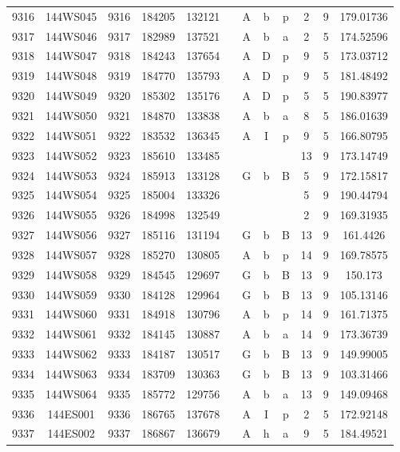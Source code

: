 \begin{tabular}{|*{12}{c|}}
9316 & 144WS045 & 9316 & 184205 & 132121 &  & A & b & p & 2 & 9 & 179.01736 \\ 
9317 & 144WS046 & 9317 & 182989 & 137521 &  & A & b & a & 2 & 5 & 174.52596 \\ 
9318 & 144WS047 & 9318 & 184243 & 137654 &  & A & D & p & 9 & 5 & 173.03712 \\ 
9319 & 144WS048 & 9319 & 184770 & 135793 &  & A & D & p & 9 & 5 & 181.48492 \\ 
9320 & 144WS049 & 9320 & 185302 & 135176 &  & A & D & p & 5 & 5 & 190.83977 \\ 
9321 & 144WS050 & 9321 & 184870 & 133838 &  & A & b & a & 8 & 5 & 186.01639 \\ 
9322 & 144WS051 & 9322 & 183532 & 136345 &  & A & I & p & 9 & 5 & 166.80795 \\ 
9323 & 144WS052 & 9323 & 185610 & 133485 &  &  &  &  & 13 & 9 & 173.14749 \\ 
9324 & 144WS053 & 9324 & 185913 & 133128 &  & G & b & B & 5 & 9 & 172.15817 \\ 
9325 & 144WS054 & 9325 & 185004 & 133326 &  &  &  &  & 5 & 9 & 190.44794 \\ 
9326 & 144WS055 & 9326 & 184998 & 132549 &  &  &  &  & 2 & 9 & 169.31935 \\ 
9327 & 144WS056 & 9327 & 185116 & 131194 &  & G & b & B & 13 & 9 & 161.4426 \\ 
9328 & 144WS057 & 9328 & 185270 & 130805 &  & A & b & p & 14 & 9 & 169.78575 \\ 
9329 & 144WS058 & 9329 & 184545 & 129697 &  & G & b & B & 13 & 9 & 150.173 \\ 
9330 & 144WS059 & 9330 & 184128 & 129964 &  & G & b & B & 13 & 9 & 105.13146 \\ 
9331 & 144WS060 & 9331 & 184918 & 130796 &  & A & b & p & 14 & 9 & 161.71375 \\ 
9332 & 144WS061 & 9332 & 184145 & 130887 &  & A & b & a & 14 & 9 & 173.36739 \\ 
9333 & 144WS062 & 9333 & 184187 & 130517 &  & G & b & B & 13 & 9 & 149.99005 \\ 
9334 & 144WS063 & 9334 & 183709 & 130363 &  & G & b & B & 13 & 9 & 103.31466 \\ 
9335 & 144WS064 & 9335 & 185772 & 129756 &  & A & b & a & 13 & 9 & 149.09468 \\ 
9336 & 144ES001 & 9336 & 186765 & 137678 &  & A & I & p & 2 & 5 & 172.92148 \\ 
9337 & 144ES002 & 9337 & 186867 & 136679 &  & A & h & a & 9 & 5 & 184.49521 \\ 

\end{tabular}
